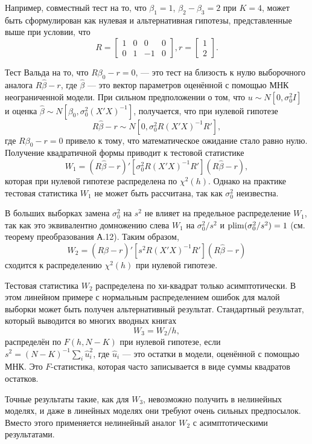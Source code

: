 Например, совместный тест на то, что $\beta_1 = 1$, $\beta_2 - \beta_3 = 2$ при $K = 4$, может быть сформулирован как нулевая и альтернативная гипотезы, представленные выше при условии, что
\[
R = \begin{bmatrix} 1 & 0 & 0 & 0 \\ 0 & 1 & -1 & 0 \end{bmatrix}, r = \begin{bmatrix} 1 \\ 2 \end{bmatrix}.
\]

Тест Вальда на то, что $R\beta_0 - r = 0$, --- это тест на близость к нулю выборочного аналога $R\hat{\beta} - r$, где $\hat{\beta}$ --- это вектор параметров оценённой с помощью МНК неограниченной модели. При сильном предположении о том, что $u \sim N[0,\sigma_0^2I]$ и оценка $\hat{\beta} \sim N[\beta_0, \sigma_0^2(X'X)^{-1}]$, получается, что при нулевой гипотезе
\[
R\hat{\beta} - r \sim N[0,\sigma_0^2R(X'X)^{-1}R'],
\]
где $R\beta_0 - r = 0$ привело к тому, что математическое ожидание стало равно нулю. Получение квадратичной формы приводит к тестовой статистике
\[
W_1 = (R\hat{\beta} - r)'[\sigma_0^2R(X'X)^{-1}R'](R\hat{\beta} - r),
\]
которая при нулевой гипотезе распределена по $\chi^2(h)$. Однако на практике тестовая статистика $W_1$ не может быть рассчитана, так как $\sigma_0^2$ неизвестна.

В больших выборках замена $\sigma_0^2$ на $s^2$ не влияет на предельное распределение $W_1$, так как это эквивалентно домножению слева $W_1$ на $\sigma_0^2/s^2$ и $\mathrm{plim }(\sigma_0^2/s^2) = 1$ (см. теорему преобразования А.12). Таким образом,
\begin{equation}
W_2 = (R\hat{\beta} - r)'[s^2R(X'X)^{-1}R'](R\hat{\beta} - r)
\end{equation}
сходится к распределению $\chi^2(h)$ при нулевой гипотезе.

Тестовая статистика $W_2$ распределена по хи-квадрат только асимптотически. В этом линейном примере с нормальным распределением ошибок для малой выборки может быть получен альтернативный результат. Стандартный результат, который выводится во многих вводных книгах
\[
W_3 = W_2/h,
\] 
распределён по $F(h,N - K)$ при нулевой гипотезе, если $s^2 = (N - K)^{-1}\sum_i \hat{u}_i^2$, где $\hat{u}_i$ --- это остатки в модели, оценённой с помощью МНК. Это $F$-статистика, которая часто записывается в виде суммы квадратов остатков.

Точные результаты такие, как для $W_3$, невозможно получить в нелинейных моделях, и даже в линейных моделях они требуют очень сильных предпосылок. Вместо этого применяется нелинейный аналог $W_2$ с асимптотическими результатами.

